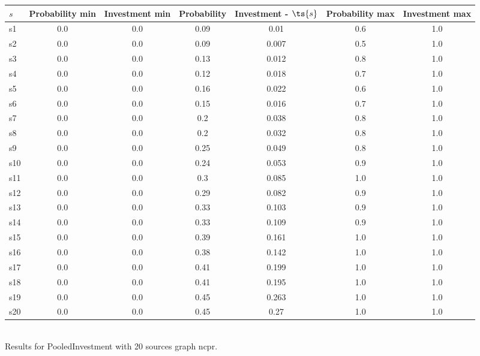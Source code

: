 \documentclass{article}
\begin{document}
\noindent\begin{tabular}{|l|c|c|c|c|c|c|}
\hline
$s$& Probability min & Investment min & Probability & Investment - $\ts{s}$ & Probability max & Investment max\\
\hline
s1 &0.0 & 0.0 & 0.09 & 0.01 & 0.6 & 1.0\\
\hline
s2 &0.0 & 0.0 & 0.09 & 0.007 & 0.5 & 1.0\\
\hline
s3 &0.0 & 0.0 & 0.13 & 0.012 & 0.8 & 1.0\\
\hline
s4 &0.0 & 0.0 & 0.12 & 0.018 & 0.7 & 1.0\\
\hline
s5 &0.0 & 0.0 & 0.16 & 0.022 & 0.6 & 1.0\\
\hline
s6 &0.0 & 0.0 & 0.15 & 0.016 & 0.7 & 1.0\\
\hline
s7 &0.0 & 0.0 & 0.2 & 0.038 & 0.8 & 1.0\\
\hline
s8 &0.0 & 0.0 & 0.2 & 0.032 & 0.8 & 1.0\\
\hline
s9 &0.0 & 0.0 & 0.25 & 0.049 & 0.8 & 1.0\\
\hline
s10 &0.0 & 0.0 & 0.24 & 0.053 & 0.9 & 1.0\\
\hline
s11 &0.0 & 0.0 & 0.3 & 0.085 & 1.0 & 1.0\\
\hline
s12 &0.0 & 0.0 & 0.29 & 0.082 & 0.9 & 1.0\\
\hline
s13 &0.0 & 0.0 & 0.33 & 0.103 & 0.9 & 1.0\\
\hline
s14 &0.0 & 0.0 & 0.33 & 0.109 & 0.9 & 1.0\\
\hline
s15 &0.0 & 0.0 & 0.39 & 0.161 & 1.0 & 1.0\\
\hline
s16 &0.0 & 0.0 & 0.38 & 0.142 & 1.0 & 1.0\\
\hline
s17 &0.0 & 0.0 & 0.41 & 0.199 & 1.0 & 1.0\\
\hline
s18 &0.0 & 0.0 & 0.41 & 0.195 & 1.0 & 1.0\\
\hline
s19 &0.0 & 0.0 & 0.45 & 0.263 & 1.0 & 1.0\\
\hline
s20 &0.0 & 0.0 & 0.45 & 0.27 & 1.0 & 1.0\\
\hline
\end{tabular}\\

\noindent Results for PooledInvestment with 20 sources graph ncpr.
\end{document}
